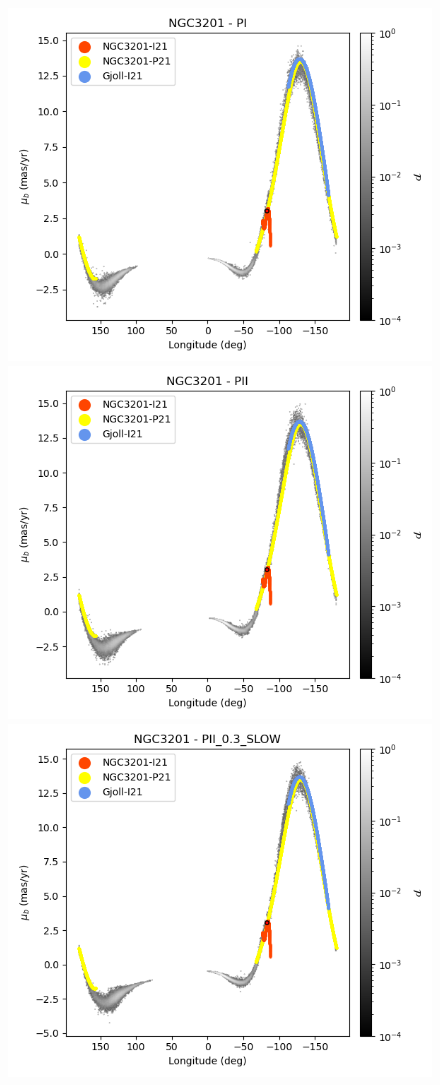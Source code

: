 \begin{figure}[h!]
\begin{center}
                    \includegraphics[clip=true, trim = 0mm 0mm 0mm 0mm, width=0.65\columnwidth]{images/PI_individual_NGC3201_galstream-NGC3201-l-pm_b.png}
                    \includegraphics[clip=true, trim = 0mm 0mm 0mm 0mm, width=0.65\columnwidth]{images/PII_individual_NGC3201_galstream-NGC3201-l-pm_b.png}
                    \includegraphics[clip=true, trim = 0mm 0mm 0mm 0mm, width=0.65\columnwidth]{images/PII_0.3_SLOW_individual_NGC3201_galstream-NGC3201-l-pm_b.png}


\end{center}
\end{figure}
